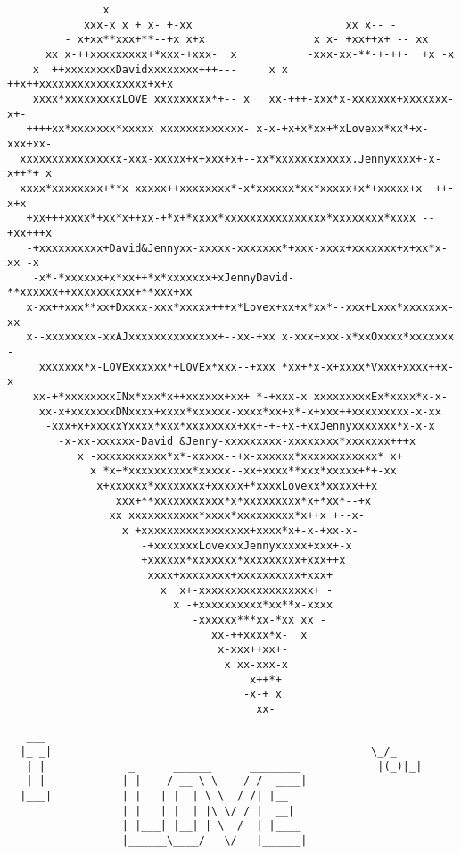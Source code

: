 \documentclass[a4paper,english]{article}
\begin{document}
\color{red}
\begin{verbatim}
               x              
            xxx-x x + x- +-xx                        xx x-- -
         - x+xx**xxx+**--+x x+x                 x x- +xx++x+ -- xx
      xx x-++xxxxxxxxx+*xxx-+xxx-  x           -xxx-xx-**-+-++-  +x -x
    x  ++xxxxxxxxDavidxxxxxxxx+++---     x x ++x++xxxxxxxxxxxxxxxxx+x+x
    xxxx*xxxxxxxxxLOVE xxxxxxxxx*+-- x   xx-+++-xxx*x-xxxxxxx+xxxxxxx-x+-
   ++++xx*xxxxxxx*xxxxx xxxxxxxxxxxxx- x-x-+x+x*xx+*xLovexx*xx*+x-xxx+xx-
  xxxxxxxxxxxxxxxx-xxx-xxxxx+x+xxx+x+--xx*xxxxxxxxxxxx.Jennyxxxx+-x-x++*+ x
  xxxx*xxxxxxxx+**x xxxxx++xxxxxxxx*-x*xxxxxx*xx*xxxxx+x*+xxxxx+x  ++- x+x
   +xx+++xxxx*+xx*x++xx-+*x+*xxxx*xxxxxxxxxxxxxxxx*xxxxxxxx*xxxx --+xx+++x
   -+xxxxxxxxxx+David&Jennyxx-xxxxx-xxxxxxx*+xxx-xxxx+xxxxxxx+x+xx*x-xx -x
    -x*-*xxxxxx+x*xx++*x*xxxxxxx+xJennyDavid-**xxxxxx++xxxxxxxxxx+**xxx+xx
   x-xx++xxx**xx+Dxxxx-xxx*xxxxx+++x*Lovex+xx+x*xx*--xxx+Lxxx*xxxxxxx-xx
   x--xxxxxxxx-xxAJxxxxxxxxxxxxxx+--xx-+xx x-xxx+xxx-x*xxOxxxx*xxxxxxx -
     xxxxxxx*x-LOVExxxxxx*+LOVEx*xxx--+xxx *xx+*x-x+xxxx*Vxxx+xxxx++x-x
    xx-+*xxxxxxxxINx*xxx*x++xxxxxx+xx+ *-+xxx-x xxxxxxxxxEx*xxxx*x-x-
     xx-x+xxxxxxxDNxxxx+xxxx*xxxxxx-xxxx*xx+x*-x+xxx++xxxxxxxxx-x-xx
      -xxx+x+xxxxxYxxxx*xxx*xxxxxxxx+xx+-+-+x-+xxJennyxxxxxxx*x-x-x
        -x-xx-xxxxxx-David &Jenny-xxxxxxxxx-xxxxxxxx*xxxxxxx+++x
           x -xxxxxxxxxxx*x*-xxxxx--+x-xxxxxx*xxxxxxxxxxxx* x+
             x *x+*xxxxxxxxxx*xxxxx--xx+xxxx**xxx*xxxxx+*+-xx
              x+xxxxxx*xxxxxxxx+xxxxx+*xxxxLovexx*xxxxx++x
                 xxx+**xxxxxxxxxxx*x*xxxxxxxxx*x+*xx*--+x
                xx xxxxxxxxxxx*xxxx*xxxxxxxxx*x++x +--x-
                  x +xxxxxxxxxxxxxxxxx+xxxx*x+-x-+xx-x-
                     -+xxxxxxxLovexxxJennyxxxxx+xxx+-x
                     +xxxxxx*xxxxxxx*xxxxxxxxx+xxx++x
                      xxxx+xxxxxxxx+xxxxxxxxxx+xxx+
                        x  x+-xxxxxxxxxxxxxxxxxx+ -
                          x -+xxxxxxxxxx*xx**x-xxxx
                             -xxxxxx***xx-*xx xx -
                                xx-++xxxx*x-  x
                                 x-xxx++xx+-
                                  x xx-xxx-x
                                      x++*+
                                     -x-+ x
                                       xx-
\end{verbatim}
\color{black}
\begin{verbatim}
   ___            
  |_ _|                                                  \_/_
   | |             _      ______      ________            |(_)|_|
   | |            | |    / __ \ \    / /  ____|
  |___|           | |   | |  | \ \  / /| |__
                  | |   | |  | |\ \/ / |  __|
                  | |___| |__| | \  /  | |____
                  |______\____/   \/   |______|
\end{verbatim}
\end{document}
